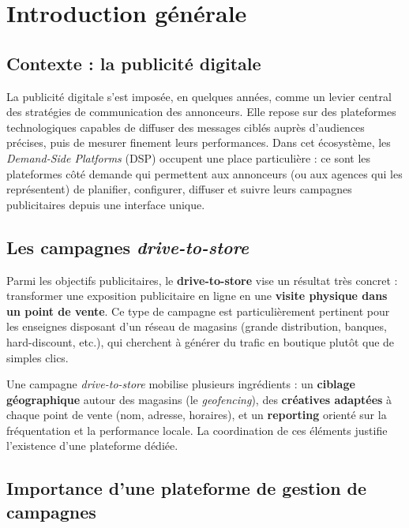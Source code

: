 \chapter{Introduction générale}

\section{Contexte : la publicité digitale}

La publicité digitale s'est imposée, en quelques années, comme un levier
central des stratégies de communication des annonceurs. Elle repose sur des
plateformes technologiques capables de diffuser des messages ciblés auprès
d'audiences précises, puis de mesurer finement leurs performances. Dans cet
écosystème, les \emph{Demand-Side Platforms} (DSP) occupent une place
particulière : ce sont les plateformes côté \og demande \fg{} qui permettent
aux annonceurs (ou aux agences qui les représentent) de planifier, configurer,
diffuser et suivre leurs campagnes publicitaires depuis une interface unique.

\section{Les campagnes \emph{drive-to-store}}

Parmi les objectifs publicitaires, le \textbf{drive-to-store} vise un résultat
très concret : transformer une exposition publicitaire en ligne en une
\textbf{visite physique dans un point de vente}. Ce type de campagne est
particulièrement pertinent pour les enseignes disposant d'un réseau de
magasins (grande distribution, banques, hard-discount, etc.), qui cherchent à
générer du trafic en boutique plutôt que de simples clics.

Une campagne \emph{drive-to-store} mobilise plusieurs ingrédients : un
\textbf{ciblage géographique} autour des magasins (le \emph{geofencing}), des
\textbf{créatives adaptées} à chaque point de vente (nom, adresse, horaires),
et un \textbf{reporting} orienté sur la fréquentation et la performance locale.
La coordination de ces éléments justifie l'existence d'une plateforme dédiée.

\section{Importance d'une plateforme de gestion de campagnes}

